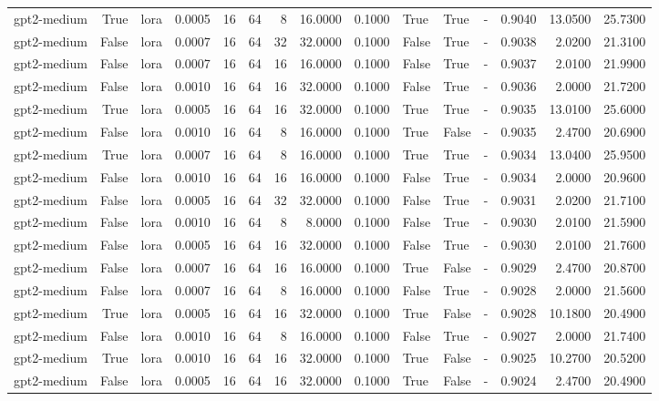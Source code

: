 \begin{tabular}{lrlrrrrrrlllrrr}
gpt2-medium & True & lora & 0.0005 & 16 & 64 & 8 & 16.0000 & 0.1000 & True & True & - & 0.9040 & 13.0500 & 25.7300 \\
gpt2-medium & False & lora & 0.0007 & 16 & 64 & 32 & 32.0000 & 0.1000 & False & True & - & 0.9038 & 2.0200 & 21.3100 \\
gpt2-medium & False & lora & 0.0007 & 16 & 64 & 16 & 16.0000 & 0.1000 & False & True & - & 0.9037 & 2.0100 & 21.9900 \\
gpt2-medium & False & lora & 0.0010 & 16 & 64 & 16 & 32.0000 & 0.1000 & False & True & - & 0.9036 & 2.0000 & 21.7200 \\
gpt2-medium & True & lora & 0.0005 & 16 & 64 & 16 & 32.0000 & 0.1000 & True & True & - & 0.9035 & 13.0100 & 25.6000 \\
gpt2-medium & False & lora & 0.0010 & 16 & 64 & 8 & 16.0000 & 0.1000 & True & False & - & 0.9035 & 2.4700 & 20.6900 \\
gpt2-medium & True & lora & 0.0007 & 16 & 64 & 8 & 16.0000 & 0.1000 & True & True & - & 0.9034 & 13.0400 & 25.9500 \\
gpt2-medium & False & lora & 0.0010 & 16 & 64 & 16 & 16.0000 & 0.1000 & False & True & - & 0.9034 & 2.0000 & 20.9600 \\
gpt2-medium & False & lora & 0.0005 & 16 & 64 & 32 & 32.0000 & 0.1000 & False & True & - & 0.9031 & 2.0200 & 21.7100 \\
gpt2-medium & False & lora & 0.0010 & 16 & 64 & 8 & 8.0000 & 0.1000 & False & True & - & 0.9030 & 2.0100 & 21.5900 \\
gpt2-medium & False & lora & 0.0005 & 16 & 64 & 16 & 32.0000 & 0.1000 & False & True & - & 0.9030 & 2.0100 & 21.7600 \\
gpt2-medium & False & lora & 0.0007 & 16 & 64 & 16 & 16.0000 & 0.1000 & True & False & - & 0.9029 & 2.4700 & 20.8700 \\
gpt2-medium & False & lora & 0.0007 & 16 & 64 & 8 & 16.0000 & 0.1000 & False & True & - & 0.9028 & 2.0000 & 21.5600 \\
gpt2-medium & True & lora & 0.0005 & 16 & 64 & 16 & 32.0000 & 0.1000 & True & False & - & 0.9028 & 10.1800 & 20.4900 \\
gpt2-medium & False & lora & 0.0010 & 16 & 64 & 8 & 16.0000 & 0.1000 & False & True & - & 0.9027 & 2.0000 & 21.7400 \\
gpt2-medium & True & lora & 0.0010 & 16 & 64 & 16 & 32.0000 & 0.1000 & True & False & - & 0.9025 & 10.2700 & 20.5200 \\
gpt2-medium & False & lora & 0.0005 & 16 & 64 & 16 & 32.0000 & 0.1000 & True & False & - & 0.9024 & 2.4700 & 20.4900 \\

\end{tabular}
